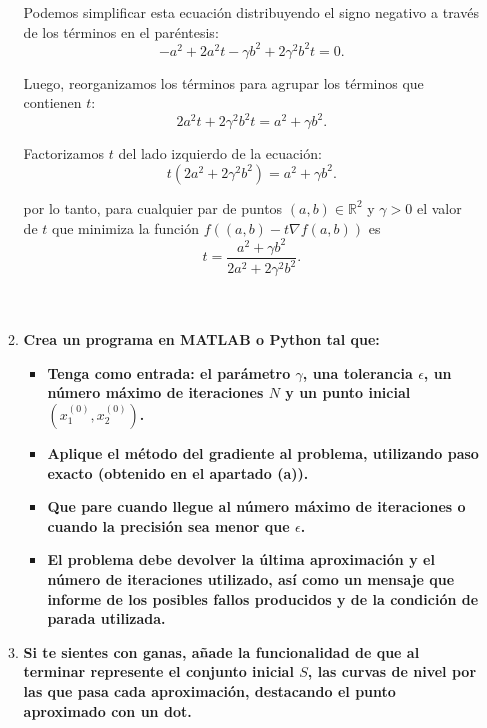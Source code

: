 \begin{enumerate}
\begin{enumerate}[\bfseries (a)]
	    Podemos simplificar esta ecuación distribuyendo el signo negativo a través de los términos en el paréntesis:
	    $$-a^2 + 2a^2t - \gamma b^2 + 2\gamma^2 b^2t = 0.$$

	    Luego, reorganizamos los términos para agrupar los términos que contienen $t$:
	    $$2a^2t + 2\gamma^2 b^2t = a^2 + \gamma b^2.$$

	    Factorizamos $t$ del lado izquierdo de la ecuación:
	    $$t(2a^2 + 2\gamma^2 b^2) = a^2 + \gamma b^2.$$

	    por lo tanto, para cualquier par de puntos $(a,b)\in \mathbb{R}^2$ y $\gamma>0$ el valor de $t$ que minimiza la función $f\left((a,b)-t\nabla f(a,b)\right)$ es
	    $$t = \frac{a^2 + \gamma b^2}{2a^2 + 2\gamma^2 b^2}.$$\\\\


	\item \textbf{\boldmath Crea un programa en MATLAB o Python tal que:}

	    \begin{itemize}

		\item \textbf{\boldmath Tenga como entrada: el parámetro $\gamma$, una tolerancia $\epsilon$, un número máximo de iteraciones $N$ y un punto inicial $\left(x_1^{(0)},x_2^{(0)}\right)$.}\\

		\item \textbf{Aplique el método del gradiente al problema, utilizando paso exacto (obtenido en el apartado (a)).}\\

		\item \textbf{\boldmath Que pare cuando llegue al número máximo de iteraciones o cuando la precisión sea menor que $\epsilon$.}\\

		\item \textbf{El problema debe devolver la última aproximación y el número de iteraciones utilizado, así como un mensaje que informe de los posibles fallos producidos y de la condición de parada utilizada.}\\

	    \end{itemize}


	\item \textbf{Si te sientes con ganas, añade la funcionalidad de que al terminar represente el conjunto inicial $S$, las curvas de nivel por las que pasa cada aproximación, destacando el punto aproximado con un dot.}\\


\end{enumerate}
\end{enumerate}
